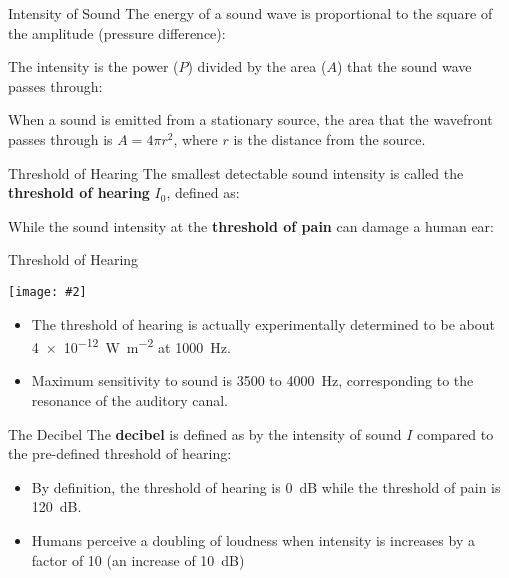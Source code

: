 \documentclass[12pt,compress,aspectratio=169]{beamer}
\newcommand{\pic}[2]{\texttt{[image: \#2]}}
\newcommand{\eq}[2]{\vspace{#1}{\Large\begin{displaymath}#2\end{displaymath}}}
\begin{document}
\begin{frame}{Intensity of Sound}
  The energy of a sound wave is proportional to the square of the amplitude
  (pressure difference):

  \eq{-.35in}{ P\propto A^2}

  \vspace{-.2in}The intensity is the power ($P$) divided by the area ($A$) that
  the sound wave passes through:

  \eq{-.25in}{
    \boxed{I=\frac{P}{A}\propto\frac{1}{r^2}}
  }
  
  \vspace{-.1in}When a sound is emitted from a stationary source, the area that
  the wavefront passes through is $A=4\pi r^2$, where $r$ is the distance from
  the source.
\end{frame}



\begin{frame}{Threshold of Hearing}
  The smallest detectable sound intensity is called the
  \textbf{threshold of hearing} $I_0$, defined as:

  \eq{-.2in}{
    I_0=\SI{1e-12}{\watt\per\metre^2}
  }

  While the sound intensity at the \textbf{threshold of pain} can damage a human
  ear:

  \eq{-.2in}{
    I_p=\SI{1}{\watt\per\metre^2}
  }
\end{frame}



\begin{frame}{Threshold of Hearing}
  \begin{center}
    \pic{.6}{earcrv2.png}
  \end{center}
  \begin{itemize}
  \item\vspace{-.15in}The threshold of hearing is actually experimentally
    determined to be about \SI{4e-12}{\watt\per\metre^2} at \SI{1000}{\hertz}.
  \item Maximum sensitivity to sound is \num{3500} to \SI{4000}{\hertz},
    corresponding to the resonance of the auditory canal.
  \end{itemize}
\end{frame}


\begin{frame}{The Decibel}
  The \textbf{decibel} is defined as by the intensity of sound $I$ compared to
  the pre-defined threshold of hearing:
  
  \eq{-.2in}{
    \beta=10\log_{10}\left[\frac{I}{I_0}\right]
  }
  \begin{itemize}
  \item By definition, the threshold of hearing is \SI{0}{dB} while the
    threshold of pain is \SI{120}{dB}.
  \item Humans perceive a doubling of loudness when intensity is increases by a
    factor of \num{10} (an increase of \SI{10}{dB})
  \end{itemize}
\end{frame}
\end{document}
